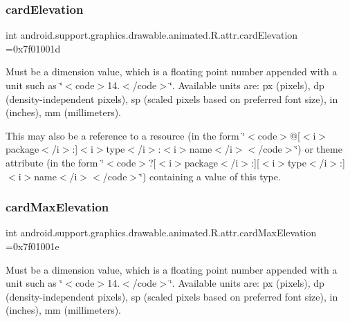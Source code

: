 \subsubsection{\texorpdfstring{card\+Elevation}{cardElevation}}
{\footnotesize\ttfamily int android.\+support.\+graphics.\+drawable.\+animated.\+R.\+attr.\+card\+Elevation =0x7f01001d\hspace{0.3cm}{\ttfamily [static]}}

Must be a dimension value, which is a floating point number appended with a unit such as \char`\"{}$<$code$>$14.\+5sp$<$/code$>$\char`\"{}. Available units are\+: px (pixels), dp (density-\/independent pixels), sp (scaled pixels based on preferred font size), in (inches), mm (millimeters). 

This may also be a reference to a resource (in the form \char`\"{}$<$code$>$@\mbox{[}$<$i$>$package$<$/i$>$\+:\mbox{]}$<$i$>$type$<$/i$>$\+:$<$i$>$name$<$/i$>$$<$/code$>$\char`\"{}) or theme attribute (in the form \char`\"{}$<$code$>$?\mbox{[}$<$i$>$package$<$/i$>$\+:\mbox{]}\mbox{[}$<$i$>$type$<$/i$>$\+:\mbox{]}$<$i$>$name$<$/i$>$$<$/code$>$\char`\"{}) containing a value of this type. \mbox{\label{classandroid_1_1support_1_1graphics_1_1drawable_1_1animated_1_1R_1_1attr_a85c2f2fa47273fdc9b75776cb2ed9f5c}} 
\subsubsection{\texorpdfstring{card\+Max\+Elevation}{cardMaxElevation}}
{\footnotesize\ttfamily int android.\+support.\+graphics.\+drawable.\+animated.\+R.\+attr.\+card\+Max\+Elevation =0x7f01001e\hspace{0.3cm}{\ttfamily [static]}}

Must be a dimension value, which is a floating point number appended with a unit such as \char`\"{}$<$code$>$14.\+5sp$<$/code$>$\char`\"{}. Available units are\+: px (pixels), dp (density-\/independent pixels), sp (scaled pixels based on preferred font size), in (inches), mm (millimeters). 

